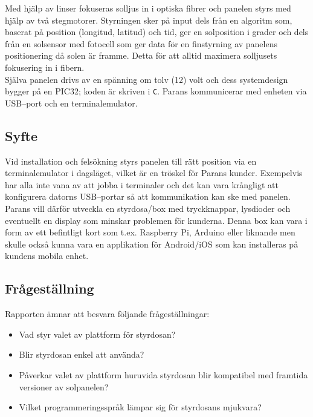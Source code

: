 \documentclass{article}
\begin{document}
            \noindent Med hjälp av linser fokuseras solljus in i optiska fibrer och panelen styrs med hjälp av två stegmotorer. Styrningen sker på input dels från en algoritm som, baserat på position (longitud, latitud) och tid, ger en solposition i grader och dels från en solsensor med fotocell som ger data för en finstyrning av panelens positionering då solen är framme. Detta för att alltid maximera solljusets fokusering in i fibern.\\

            \noindent Själva panelen drivs av en spänning om tolv (12) volt och dess systemdesign bygger på en PIC32; koden är skriven i \texttt{C}. Parans kommunicerar med enheten via USB--port och en terminalemulator. 
        
        \subsection{Syfte} %
        \label{sub:syfte}
            Vid installation och felsökning styrs panelen till rätt position via en terminalemulator i dagsläget, vilket är en tröskel för Parans kunder.  Exempelvis har alla inte vana av att jobba i terminaler och det kan vara krångligt att konfigurera datorns USB--portar så att kommunikation kan ske med panelen. \\

            \noindent Parans vill därför utveckla en styrdosa/box med tryckknappar, lysdioder och eventuellt en display som minskar problemen för kunderna. Denna box kan vara i form av ett befintligt kort som t.ex. Raspberry Pi, Arduino eller liknande men skulle också kunna vara en applikation för Android/iOS som kan installeras på kundens mobila enhet.

        \subsection{Frågeställning} %
        \label{sub:fragestallning}
        Rapporten ämnar att besvara följande frågeställningar:
        \begin{itemize}
            \item Vad styr valet av plattform för styrdosan?
            \item Blir styrdosan enkel att använda?
            \item Påverkar valet av plattform huruvida styrdosan blir kompatibel med framtida versioner av solpanelen?
            \item Vilket programmeringsspråk lämpar sig för styrdosans mjukvara?
        \end{itemize}   
        
\end{document}

